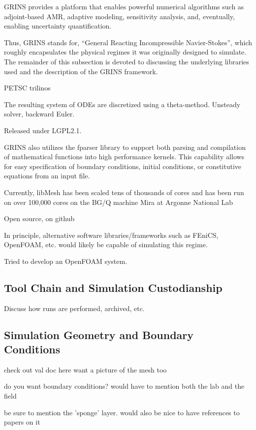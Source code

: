 GRINS provides a platform that enables powerful numerical algorithms
such as adjoint-based AMR, adaptive modeling, sensitivity analysis,
and, eventually, enabling uncertainty quantification.

Thus, GRINS stands for, ``General Reacting Incompressible Navier-Stokes'',
which roughly encapsulates the physical regimes it was originally
designed to simulate. 
The remainder of this subsection is devoted to discussing the underlying
libraries used and the description of the GRINS framework. 

PETSC\cite{petsc} trilinos\cite{trilinos}

The resulting system of ODEs are discretized using a theta-method. 
Unsteady solver, backward Euler. 

Released under LGPL2.1\cite{lgpl}. 

GRINS also utilizes the fparser\cite{fparser}
library to support both parsing and compilation of mathematical
functions into high 
performance kernels. This capability allows for easy specification of
boundary conditions, initial conditions, or constitutive equations from an input file. 

Currently, libMesh has been scaled tens of thousands of cores and has
been run on over 100,000 cores on the BG/Q machine Mira at Argonne National
Lab\cite{libmesh-scaling}

Open source, on github\cite{github}

In principle, alternative software libraries/frameworks such as
FEniCS\cite{fenics}, OpenFOAM\cite{openfoam}, etc. would likely be
capable of simulating this regime. 

Tried to develop an OpenFOAM system.   

\subsection{Tool Chain and Simulation Custodianship}

Discuss how runs are performed, archived, etc. 

\subsection{Simulation Geometry and Boundary Conditions}

check out val doc here
want a picture of the mesh too

do you want boundary conditions? would have to mention both the lab and
the field

be sure to mention the 'sponge' layer. would also be nice to have references to papers on it
